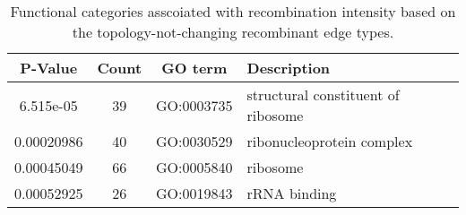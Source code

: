 \documentclass[10pt]{article}
\providecommand{\tabularnewline}{\\}
\begin{document}
\begin{table}
\caption{\label{tab:functional-notopology}Functional categories asscoiated with 
recombination intensity based on the topology-not-changing recombinant edge types.}
\noindent \begin{centering}
\begin{tabular}{cccl}
\hline 
P-Value & Count & GO term & Description\tabularnewline
\hline 
6.515e-05 & 39 & GO:0003735 & structural constituent of ribosome\tabularnewline
0.00020986 & 40 & GO:0030529 & ribonucleoprotein complex\tabularnewline
0.00045049 & 66 & GO:0005840 & ribosome\tabularnewline
0.00052925 & 26 & GO:0019843 & rRNA binding\tabularnewline
\hline 
\end{tabular}
\par\end{centering}
\end{table}




\end{document}
